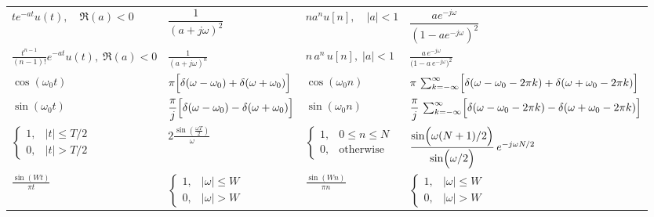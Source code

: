 \documentclass{article}
\begin{document}
\begin{multicols}{2}
\begin{table*}[ht]
\begin{tabular}{@{}llll@{}}
            $t e^{-at} u(t),\quad \Re(a)<0$                                & $\dfrac{1}{(a+j\omega)^2}$                                                    & $n a^n u[n],\quad |a|<1$                                                & $\dfrac{a e^{-j\omega}}{(1-a e^{-j\omega})^2}$                                                                         \\ [1mm]
            $\frac{t^{n-1}}{(n-1)!}e^{-a t}u(t),\;\Re(a)<0$                & $\frac{1}{(a + j\omega)^n}$                                                   & $n\,a^n\,u[n],\;|a|<1$                                                  & $\frac{a\,e^{-j\omega}}{\bigl(1 - a\,e^{-j\omega}\bigr)^2}$                                                            \\ [1mm]
            $\cos(\omega_0 t)$                                             & $\pi\Bigl[\delta(\omega-\omega_0) + \delta(\omega+\omega_0)\Bigr]$            & $\cos(\omega_0 n)$                                                      & $\pi\,\sum_{k=-\infty}^{\infty}\Bigl[\delta(\omega-\omega_0-2\pi k) + \delta(\omega+\omega_0-2\pi k)\Bigr]$            \\ [1mm]
            $\sin(\omega_0 t)$                                             & $\dfrac{\pi}{j}\Bigl[\delta(\omega-\omega_0) - \delta(\omega+\omega_0)\Bigr]$ & $\sin(\omega_0 n)$                                                      & $\dfrac{\pi}{j}\,\sum_{k=-\infty}^{\infty}\Bigl[\delta(\omega-\omega_0-2\pi k) - \delta(\omega+\omega_0-2\pi k)\Bigr]$ \\ [1mm]
            $\begin{cases} 1, & |t| \le T/2 \\ 0, & |t| > T/2 \end{cases}$ & $2\frac{\sin\left(\frac{\omega T}{2}\right)}{\omega}$                         & $\begin{cases} 1, & 0 \le n \le N \\ 0, & \text{otherwise} \end{cases}$ & $\dfrac{\sin\Bigl(\omega (N+1)/2\Bigr)}{\sin\Bigl(\omega/2\Bigr)}\,e^{-j\omega N/2}$                                   \\ [1mm]
            $\frac{\sin\left(Wt\right)}{\pi t}$                            & $\begin{cases} 1, & |\omega| \le W \\ 0, & |\omega| > W \end{cases}$          & $\frac{\sin\left(Wn\right)}{\pi n}$                                     & $\begin{cases} 1, & |\omega| \le W \\ 0, & |\omega| > W \end{cases}$                                                   \\ [1mm]
            \bottomrule
        \end{tabular}
    \end{table*}


\end{multicols}
\end{document}
